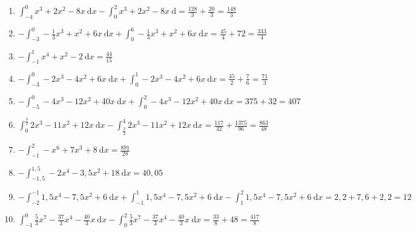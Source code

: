 \documentclass[a4paper,12pt, headsepline, ngerman]{scrartcl}
\theoremstyle{definition}
\newcommand{\td}{\ \text{d}}
\begin{document}
\begin{Answer}[ref=flaecheRechnA1]\\
	\begin{enumerate}[label=\alph*)]
		\item \(\displaystyle\int_{-4}^{0} x^3+2x^2-8x\td x-\int_{0}^{2} x^3+2x^2-8x\td=\frac{128}{3}+\frac{20}{3}=\frac{148}{3}\)\\
		\item \(\displaystyle-\int_{-3}^{0} -\frac{1}{3}x^3+x^2+6x\td x+\int_{0}^{6} -\frac{1}{3}x^3+x^2+6x\td x=\frac{45}{4}+72=\frac{333}{4}\)\\
		\item \(\displaystyle-\int_{-1}^{1} x^4+x^2-2\td x=\frac{44}{15}\)\\
		\item \(\displaystyle-\int_{-3}^{0} -2x^3-4x^2+6x\td x+\int_{0}^{1} -2x^3-4x^2+6x\td x=\frac{45}{2}+\frac{7}{6}=\frac{71}{3}\)\\
		\item \(\displaystyle -\int_{-5}^{0}-4x^3-12x^2+40x \td x +\int_{0}^{2}-4x^3-12x^2+40x \td x=375+32=407\)\\
		\item \(\displaystyle \int_{0}^{\tfrac{3}{2}} 2x^3-11x^2+12x \td x - \int_{\tfrac{3}{2}}^{4} 2x^3-11x^2+12x \td x=\frac{117}{32}+\frac{1375}{96}=\frac{863}{48}\)\\
		\item \(\displaystyle -\int_{-1}^{2} -x^6+7x^3+8 \td x=\frac{891}{28}\)\\
		\item \(\displaystyle -\int_{-1,5}^{1,5} -2x^4-3,5x^2+18 \td x=40,05\)\\
		\item \(\displaystyle-\int_{-2}^{-1} 1,5x^4-7,5x^2+6\td x+\int_{-1}^{1} 1,5x^4-7,5x^2+6\td x-\int_{1}^{2} 1,5x^4-7,5x^2+6\td x=2,2+7,6+2,2=12\)\\
		\item \(\displaystyle \int_{-1}^{0} \frac{5}{3}x^7-\frac{37}{3}x^4-\frac{40}{3}x \td x-\int_{0}^{2} \frac{5}{3}x^7-\frac{37}{3}x^4-\frac{40}{3}x \td x=\frac{33}{8}+48=\frac{417}{8}\)		
	\end{enumerate}
\end{Answer}
\end{document}
